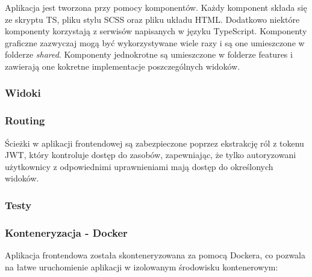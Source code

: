 \documentclass[../../main.tex]{subfiles}
\begin{document}
    Aplikacja jest tworzona przy pomocy komponentów. Każdy komponent składa się ze skryptu TS, pliku stylu SCSS oraz pliku układu HTML. Dodatkowo niektóre komponenty korzystają z serwisów napisanych w języku TypeScript. Komponenty graficzne zazwyczaj mogą być wykorzystywane wiele razy i są one umieszczone w folderze \emph{shared}. Komponenty jednokrotne są umieszczone w folderze features i zawierają one kokretne implementacje poszczególnych widoków.

    \subsubsection{Widoki}

    \subsubsection{Routing}
    Ścieżki w aplikacji frontendowej są zabezpieczone poprzez ekstrakcję ról z tokenu JWT, który kontroluje dostęp do zasobów, zapewniając, że tylko autoryzowani użytkownicy z odpowiednimi uprawnieniami mają dostęp do określonych widoków.

    \subsubsection{Testy}

    \subsubsection{Konteneryzacja - Docker}
    Aplikacja frontendowa została skonteneryzowana za pomocą Dockera, co pozwala na łatwe uruchomienie aplikacji w izolowanym środowisku kontenerowym:
\end{document}
